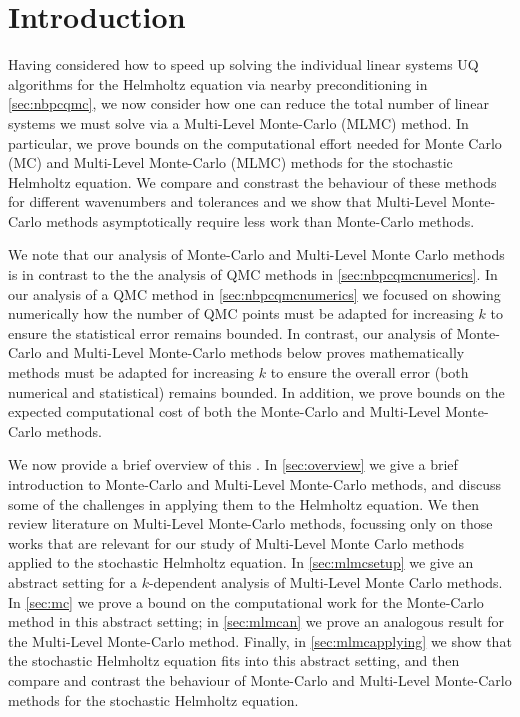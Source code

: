 \section{Introduction}

Having considered how to speed up solving the individual linear systems UQ algorithms for the Helmholtz equation via nearby preconditioning in \cref{sec:nbpcqmc}, we now consider how one can reduce the total number of linear systems we must solve via a Multi-Level Monte-Carlo (MLMC) method. In particular, we prove bounds on the computational effort needed for Monte Carlo (MC) and Multi-Level Monte-Carlo (MLMC) methods for the stochastic Helmholtz equation. We compare and constrast the behaviour of these methods for different wavenumbers and tolerances and we show that Multi-Level Monte-Carlo methods asymptotically require less work than Monte-Carlo methods.

We note that our analysis of Monte-Carlo and Multi-Level Monte Carlo methods is in contrast to the the analysis of QMC methods in \cref{sec:nbpcqmcnumerics}. In our analysis of a QMC method in \cref{sec:nbpcqmcnumerics} we focused on showing numerically how the number of QMC points must be adapted for increasing $k$ to ensure the statistical error remains bounded. In contrast, our analysis of Monte-Carlo and Multi-Level Monte-Carlo methods below proves mathematically methods must be adapted for increasing $k$ to ensure the overall error (both numerical and statistical) remains bounded. In addition, we prove bounds on the expected computational cost of both the Monte-Carlo and Multi-Level Monte-Carlo methods.

We now provide a brief overview of this . In \cref{sec:overview} we give a brief introduction to Monte-Carlo and Multi-Level Monte-Carlo methods, and discuss some of the challenges in applying them to the Helmholtz equation. We then review literature on Multi-Level Monte-Carlo methods, focussing only on those works that are relevant for our study of Multi-Level Monte Carlo methods applied to the stochastic Helmholtz equation. In \cref{sec:mlmcsetup} we give an abstract setting for a $k$-dependent analysis of Multi-Level Monte Carlo methods. In \cref{sec:mc} we prove a bound on the computational work for the Monte-Carlo method in this abstract setting; in \cref{sec:mlmcan} we prove an analogous result for the Multi-Level Monte-Carlo method. Finally, in \cref{sec:mlmcapplying} we show that the stochastic Helmholtz equation fits into this abstract setting, and then compare and contrast the behaviour of Monte-Carlo and Multi-Level Monte-Carlo methods for the stochastic Helmholtz equation.

